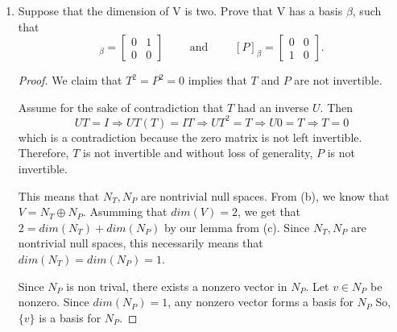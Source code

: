 \documentclass[11pt]{scrartcl}
\begin{document}
\begin{enumerate}[label=\alph*.]
{\begin{proof}
		      By using the lemma above,
		      \begin{align*}
			      dim(V) & = dim(N_T) + dim(N_P)                       \\
			             & = dim(N_T) + dim(N_T) = dim(N_P) + dim(N_P) \\
			             & = 2dim(N_T) = 2dim(N_P)
		      \end{align*}
		      as desired. Therefore, $dim(V)$ is even.
	      \end{proof}
	      }
	\item{
	      Suppose that the dimension of $\mathrm{V}$ is two. Prove that $\mathrm{V}$ has a basis $\beta$, such that
	      \begin{equation}
		      [T]_{\beta} = \left [ \begin{array}{cc}
				      0 & 1 \\
				      0 & 0
			      \end{array} \right] \qquad \text{ and } \qquad [P]_{\beta} = \left [ \begin{array}{cc}
				      0 & 0 \\
				      1 & 0
			      \end{array} \right] .
	      \end{equation}
	      \begin{proof}
		      We claim that $T^2 = P^2 = 0$ implies that $T$ and $P$ are not invertible.

		      Assume for the sake of contradiction that $T$ had an inverse $U$.
		      Then \[UT = I \Rightarrow UT(T) = IT \Rightarrow UT^2 = T \Rightarrow U0 = T \Rightarrow T=0\]
		      which is a contradiction because the zero matrix
			  is not left invertible. Therefore, $T$ is not invertible and without loss of generality, 
			  $P$ is not invertible. \par

		      This means that $N_T,N_P$ are
		      nontrivial null spaces. From (b), we know that $V = N_T \oplus N_P$. Asumming that $dim(V) = 2$,
		      we get that $2 = dim(N_T) + dim(N_P)$ by our lemma from (c). Since $N_T,N_P$ are nontrivial null spaces,
		      this necessarily means that $dim(N_T) = dim(N_P) = 1$.\par

		      Since $N_P$ is non trival, there exists a nonzero vector in $N_P$. Let $v \in N_P$ be nonzero. Since
		      $dim(N_P) = 1$, any nonzero vector forms a basis for $N_P$ So, $\{v\}$ is a basis for $N_P$.\par


\end{proof}}
\end{enumerate}
\end{document}
